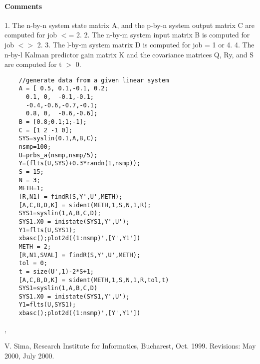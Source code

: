 \paragraph{Comments}
1. The n-by-n system state matrix A, and the p-by-n system output  matrix C are computed for job $<$= 2.
2. The n-by-m system input matrix B is computed for job $<$$>$ 2.
3. The l-by-m system matrix D is computed for job = 1 or 4.
4. The n-by-l Kalman predictor gain matrix K and the covariance matrices Q, Ry, and S are computed for t $>$ 0.
\begin{examples}
  \begin{Verbatim}
    //generate data from a given linear system
    A = [ 0.5, 0.1,-0.1, 0.2;
      0.1, 0,  -0.1,-0.1;      
      -0.4,-0.6,-0.7,-0.1;  
      0.8, 0,  -0.6,-0.6];      
    B = [0.8;0.1;1;-1];
    C = [1 2 -1 0];
    SYS=syslin(0.1,A,B,C);
    nsmp=100;
    U=prbs_a(nsmp,nsmp/5);
    Y=(flts(U,SYS)+0.3*randn(1,nsmp));
    S = 15;
    N = 3;
    METH=1;
    [R,N1] = findR(S,Y',U',METH);
    [A,C,B,D,K] = sident(METH,1,S,N,1,R);
    SYS1=syslin(1,A,B,C,D);
    SYS1.X0 = inistate(SYS1,Y',U');
    Y1=flts(U,SYS1);
    xbasc();plot2d((1:nsmp)',[Y',Y1'])
    METH = 2;
    [R,N1,SVAL] = findR(S,Y',U',METH);
    tol = 0;
    t = size(U',1)-2*S+1;
    [A,C,B,D,K] = sident(METH,1,S,N,1,R,tol,t)
    SYS1=syslin(1,A,B,C,D)
    SYS1.X0 = inistate(SYS1,Y',U');
    Y1=flts(U,SYS1);
    xbasc();plot2d((1:nsmp)',[Y',Y1'])
  \end{Verbatim}
\end{examples}
\begin{manseealso}
  ,   
\end{manseealso}
\begin{authors}
  V. Sima, Research Institute for Informatics, Bucharest, Oct. 1999. 
  Revisions: May 2000, July 2000. 
\end{authors}
